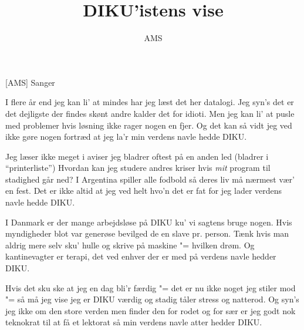 \documentclass[a4paper,11pt]{article}
\title{DIKU'istens vise}
\author{AMS}
\begin{document}
\maketitle

\begin{roles}
[AMS] Sanger
\end{roles}

\begin{song}
I flere år end jeg kan li' at mindes
har jeg læst det her datalogi.
Jeg syn's det er det dejligste der findes
skønt andre kalder det for idioti.
Men jeg kan li' at pusle med problemer
hvis løsning ikke rager nogen en fjer.
Og det kan så vidt jeg ved
ikke gøre nogen fortræd
at jeg la'r min verdens navle hedde DIKU.

Jeg læser ikke meget i aviser
jeg bladrer oftest på en anden led
  (bladrer i "`printerliste"')
Hvordan kan jeg studere andres kriser
hvis {\em mit} program til stadighed går ned?
I Argentina spiller alle fodbold
så deres liv må nærmest vær' en fest.
Det er ikke altid at
jeg ved helt hvo'n det er fat
for jeg lader verdens navle hedde DIKU.

I Danmark er der mange arbejdsløse
på DIKU ku' vi sagtens bruge nogen.
Hvis myndigheder blot var generøse
bevilged de en slave pr. person.
Tænk hvis man aldrig mere selv sku' hulle
og skrive på maskine "= hvilken drøm.
Og kantinevagter er
terapi, det ved enhver
der er med på verdens navle hedder DIKU.

Hvis det sku ske at jeg en dag bli'r færdig
"= det er nu ikke noget jeg stiler mod "=
så må jeg vise jeg er DIKU værdig
og stadig tåler stress og natterod.
Og syn's jeg ikke om den store verden
men finder den for rodet og for sær
er jeg godt nok teknokrat
til at få et lektorat
så min verdens navle atter hedder DIKU.
\end{song}
\end{document}
